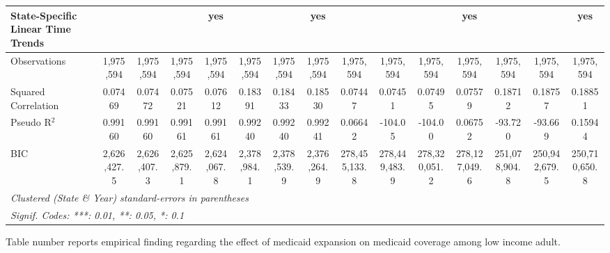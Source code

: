\documentclass[
]{article}
\begin{document}
\begin{landscape}
\begin{table}[htbp]
\begin{adjustbox}{width = 1.5\textwidth, center}
\begin{threeparttable}[b]
\begin{tabular}{lcccccccccccccc}
            State-Specific Linear Time Trends         &                &                &                & yes            &               &               & yes           &                &                &                & yes            &               &               & yes\\  
            \midrule 
            Observations                              & 1,975,594      & 1,975,594      & 1,975,594      & 1,975,594      & 1,975,594     & 1,975,594     & 1,975,594     & 1,975,594      & 1,975,594      & 1,975,594      & 1,975,594      & 1,975,594     & 1,975,594     & 1,975,594\\  
            Squared Correlation                       & 0.07469        & 0.07472        & 0.07521        & 0.07612        & 0.18391       & 0.18433       & 0.18530       & 0.07447        & 0.07451        & 0.07495        & 0.07579        & 0.18712       & 0.18757       & 0.18851\\  
            Pseudo R$^2$                              & 0.99160        & 0.99160        & 0.99161        & 0.99161        & 0.99240       & 0.99240       & 0.99241       & 0.06642        & -104.05        & -104.00        & 0.06752        & -93.720       & -93.669       & 0.15944\\  
            BIC                                       & 2,626,427.5    & 2,626,407.3    & 2,625,879.1    & 2,624,067.8    & 2,378,984.1   & 2,378,539.9   & 2,376,264.9   & 278,455,133.8  & 278,449,483.9  & 278,320,051.2  & 278,127,049.6  & 251,078,904.8 & 250,942,679.5 & 250,710,650.8\\  
            \midrule \midrule
            \multicolumn{15}{l}{\emph{Clustered (State \& Year) standard-errors in parentheses}}\\
            \multicolumn{15}{l}{\emph{Signif. Codes: ***: 0.01, **: 0.05, *: 0.1}}\\
         \end{tabular}
      \end{threeparttable}
   \end{adjustbox}
\end{table}
\end{landscape}

Table number reports empirical finding regarding the effect of medicaid
expansion on medicaid coverage among low income adult.
\end{document}
